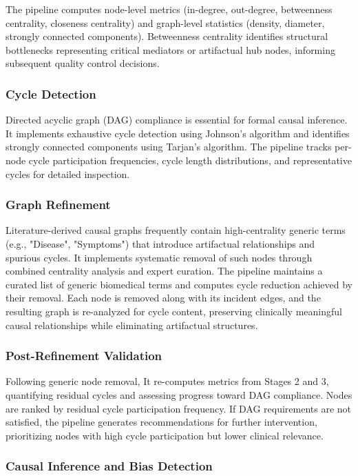 \documentclass[preprint,12pt,numbers,sort&compress]{elsarticle}
\begin{document}
The pipeline computes node-level metrics (in-degree, out-degree, betweenness centrality, closeness centrality) and graph-level statistics (density, diameter, strongly connected components). Betweenness centrality identifies structural bottlenecks representing critical mediators or artifactual hub nodes, informing subsequent quality control decisions.

\subsubsection{Cycle Detection}

Directed acyclic graph (DAG) compliance is essential for formal causal inference. It implements exhaustive cycle detection using Johnson's algorithm and identifies strongly connected components using Tarjan's algorithm. The pipeline tracks per-node cycle participation frequencies, cycle length distributions, and representative cycles for detailed inspection.

\subsubsection{Graph Refinement}

Literature-derived causal graphs frequently contain high-centrality generic terms (e.g., "Disease", "Symptoms") that introduce artifactual relationships and spurious cycles. It implements systematic removal of such nodes through combined centrality analysis and expert curation. The pipeline maintains a curated list of generic biomedical terms and computes cycle reduction achieved by their removal. Each node is removed along with its incident edges, and the resulting graph is re-analyzed for cycle content, preserving clinically meaningful causal relationships while eliminating artifactual structures.

\subsubsection{Post-Refinement Validation}

Following generic node removal, It re-computes metrics from Stages 2 and 3, quantifying residual cycles and assessing progress toward DAG compliance. Nodes are ranked by residual cycle participation frequency. If DAG requirements are not satisfied, the pipeline generates recommendations for further intervention, prioritizing nodes with high cycle participation but lower clinical relevance.

\subsubsection{Causal Inference and Bias Detection}
\end{document}
